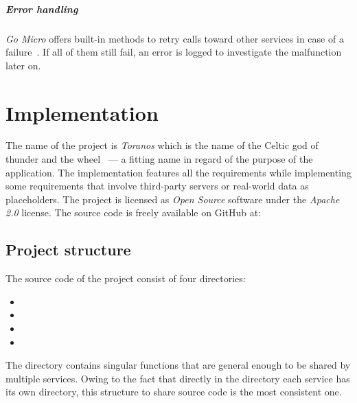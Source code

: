 \documentclass[12pt,a4paper,twoside]{report}
\begin{document}
\paragraph{Error handling}
\textit{Go Micro} offers built-in methods to retry calls toward
other services in case of a failure~\cite{go-micro}. If all of them still fail,
an error is logged to investigate the malfunction later on.



\chapter{Implementation} \label{chap:implementation}



The name of the project is \textit{Toranos} which is the name of the
Celtic god of thunder and the wheel~\cite{celtic-mythology} ---
a fitting name in regard of the purpose of the application.
The implementation features all the requirements while implementing
some requirements that involve third-party servers or real-world data
as placeholders.
The project is licensed as \textit{Open Source} software under the
\textit{Apache 2.0} license. The source code is freely available on GitHub at:\\


\section{Project structure}

The source code of the project consist of four directories:
\begin{itemize}[noitemsep]
\item {}
\item {}
\item {}
\item {}
\end{itemize}
The  directory contains singular functions that are general
enough to be shared by multiple services. Owing to the fact that directly in the
 directory each service has its own directory, this structure
to share source code is the most consistent one.
\end{document}
